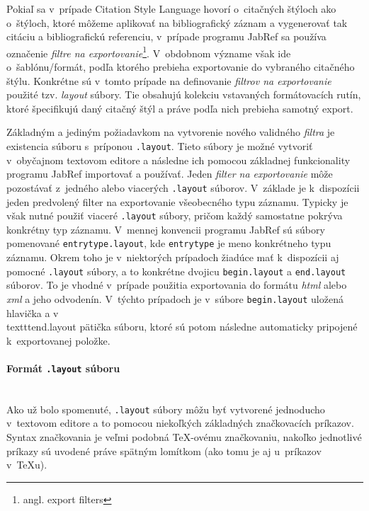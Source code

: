 \documentclass{fithesis3}
\begin{document}
	Pokiaľ sa v~prípade Citation Style Language hovorí o~citačných štýloch ako o~štýloch, ktoré môžeme aplikovať na bibliografický záznam a vygenerovať tak citáciu a bibliografickú referenciu, v~prípade programu JabRef sa používa označenie \textit{filtre na exportovanie}\footnote{angl. export filters}. V~obdobnom význame však ide o~šablónu/formát, podľa ktorého prebieha exportovanie do vybraného citačného štýlu. Konkrétne sú v~tomto prípade na definovanie \textit{filtrov na exportovanie} použité tzv. \textit{layout} súbory. Tie obsahujú kolekciu vstavaných formátovacích rutín, ktoré špecifikujú daný citačný štýl a práve podľa nich prebieha samotný export.
	
	Základným a jediným požiadavkom na vytvorenie nového validného \textit{filtra} je existencia súboru s~príponou \texttt{.layout}. Tieto súbory je možné vytvoriť v~obyčajnom textovom editore a následne ich pomocou základnej funkcionality programu JabRef importovať a používať. Jeden \textit{filter na exportovanie} môže pozostávať z~jedného alebo viacerých \texttt{.layout} súborov. V~základe je k~dispozícii jeden predvolený filter na exportovanie všeobecného typu záznamu. Typicky je však nutné použiť viaceré \texttt{.layout} súbory, pričom každý samostatne pokrýva konkrétny typ záznamu. V~mennej konvencii programu JabRef sú súbory pomenované \texttt{entrytype.layout}, kde \texttt{entrytype} je meno konkrétneho typu záznamu.
	Okrem toho je v~niektorých prípadoch žiadúce mať k~dispozícii aj pomocné \texttt{.layout} súbory, a to konkrétne dvojicu \texttt{begin.layout} a \texttt{end.layout} súborov. To je vhodné v~prípade použitia exportovania do formátu \textit{html} alebo \textit{xml} a jeho odvodenín. V~týchto prípadoch je v~súbore \texttt{begin.layout} uložená hlavička a v~\\texttt{end.layout} pätička súboru, ktoré sú potom následne automaticky pripojené k~exportovanej položke.

	\paragraph{Formát \texttt{.layout} súboru}\hfill\\
	
	Ako už bolo spomenuté, \texttt{.layout} súbory môžu byť vytvorené jednoducho v~textovom editore a to pomocou niekoľkých základných značkovacích príkazov. Syntax značkovania je veľmi podobná \TeX -ovému značkovaniu, nakoľko jednotlivé príkazy sú uvodené práve spätným lomítkom (ako tomu je aj u~príkazov v~\TeX u).
	
\end{document}
